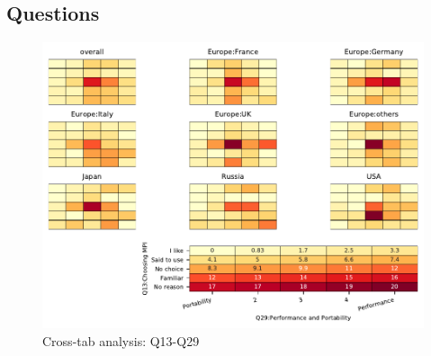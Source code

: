 
\subsection{Questions}


\begin{figure}
\begin{center}
\includegraphics[width=12cm]{../pdfs/Q13-Q29.pdf}
\caption{Cross-tab analysis: Q13-Q29}
\label{fig:Q13-Q29}
\end{center}
\end{figure}
